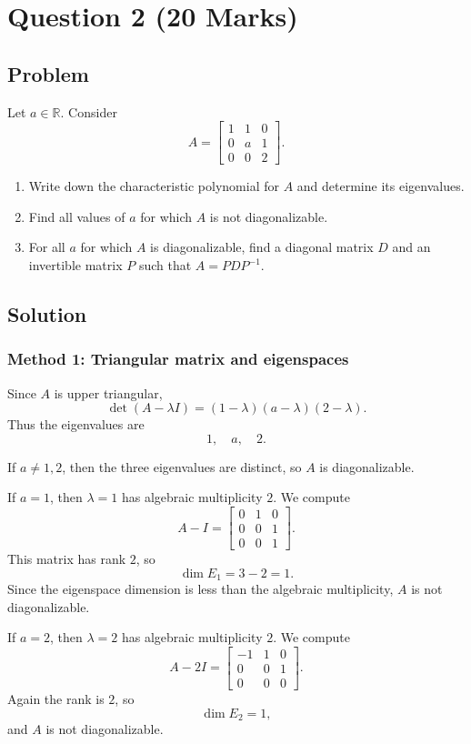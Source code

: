 \documentclass[12pt]{article}
\newcommand{\R}{\mathbb{R}}
\begin{document}
\newpage
\section{Question 2 \hfill (20 Marks)}

\subsection{Problem}
Let $a\in\R$. Consider
\[
A=\begin{bmatrix}
1&1&0\\
0&a&1\\
0&0&2
\end{bmatrix}.
\]
\begin{enumerate}[label=(\alph*)]
  \item Write down the characteristic polynomial for $A$ and determine its eigenvalues.
  \item Find all values of $a$ for which $A$ is not diagonalizable.
  \item For all $a$ for which $A$ is diagonalizable, find a diagonal matrix $D$ and an invertible matrix $P$ such that $A=PDP^{-1}$.
\end{enumerate}

\subsection{Solution}

\subsubsection{Method 1: Triangular matrix and eigenspaces}
Since $A$ is upper triangular,
\[
\det(A-\lambda I)=(1-\lambda)(a-\lambda)(2-\lambda).
\]
Thus the eigenvalues are
\[
\boxed{1,
\quad a,
\quad 2.}
\]

If $a\neq1,2$, then the three eigenvalues are distinct, so $A$ is diagonalizable.

If $a=1$, then $\lambda=1$ has algebraic multiplicity $2$. We compute
\[
A-I=\begin{bmatrix}0&1&0\\0&0&1\\0&0&1\end{bmatrix}.
\]
This matrix has rank $2$, so
\[
\dim E_1=3-2=1.
\]
Since the eigenspace dimension is less than the algebraic multiplicity, $A$ is not diagonalizable.

If $a=2$, then $\lambda=2$ has algebraic multiplicity $2$. We compute
\[
A-2I=\begin{bmatrix}-1&1&0\\0&0&1\\0&0&0\end{bmatrix}.
\]
Again the rank is $2$, so
\[
\dim E_2=1,
\]
and $A$ is not diagonalizable.
\end{document}
